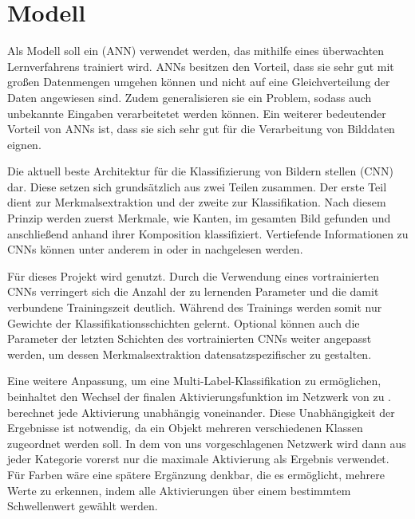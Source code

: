 \section{Modell} \label{sec:model}

Als Modell soll ein  (ANN) verwendet werden, das mithilfe eines überwachten Lernverfahrens trainiert wird. ANNs besitzen den Vorteil, dass sie sehr gut mit großen Datenmengen umgehen können und nicht auf eine Gleichverteilung der Daten angewiesen sind. Zudem generalisieren sie ein Problem, sodass auch unbekannte Eingaben verarbeitetet werden können. Ein weiterer bedeutender Vorteil von ANNs ist, dass sie sich sehr gut für die Verarbeitung von Bilddaten eignen. \cite{Mahanta2020}

Die aktuell beste Architektur für die Klassifizierung von Bildern stellen  (CNN) dar. Diese setzen sich grundsätzlich aus zwei Teilen zusammen. Der erste Teil dient zur Merkmalsextraktion und der zweite zur Klassifikation. Nach diesem Prinzip werden zuerst Merkmale, wie Kanten, im gesamten Bild gefunden und anschließend anhand ihrer Komposition klassifiziert. Vertiefende Informationen zu CNNs können unter anderem in \cite{Goodfellow2016} oder in \cite{CS2020} nachgelesen werden.

Für dieses Projekt wird  genutzt. Durch die Verwendung eines vortrainierten CNNs verringert sich die Anzahl der zu lernenden Parameter und die damit verbundene Trainingszeit deutlich. Während des Trainings werden somit nur Gewichte der Klassifikationsschichten gelernt. Optional können auch die Parameter der letzten Schichten des vortrainierten CNNs weiter angepasst werden, um dessen Merkmalsextraktion datensatzspezifischer zu gestalten.

Eine weitere Anpassung, um eine Multi-Label-Klassifikation zu ermöglichen, beinhaltet den Wechsel der finalen Aktivierungsfunktion im Netzwerk von  zu .  berechnet jede Aktivierung unabhängig voneinander. Diese Unabhängigkeit der Ergebnisse ist notwendig, da ein Objekt mehreren verschiedenen Klassen zugeordnet werden soll. In dem von uns vorgeschlagenen Netzwerk wird dann aus jeder Kategorie vorerst nur die maximale Aktivierung als Ergebnis verwendet. Für Farben wäre eine spätere Ergänzung denkbar, die es ermöglicht, mehrere Werte zu erkennen, indem alle Aktivierungen über einem bestimmtem Schwellenwert gewählt werden. 

